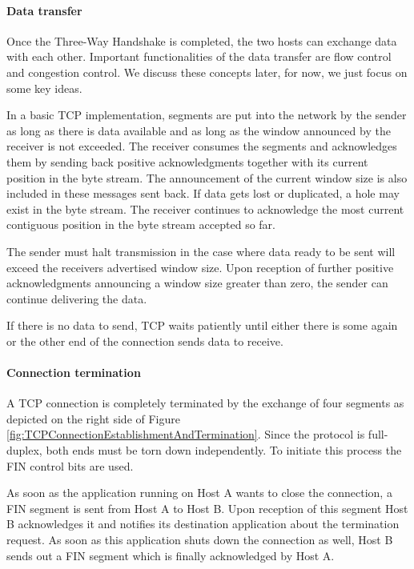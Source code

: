 \paragraph{Data transfer}

Once the Three-Way Handshake is completed, the two hosts can exchange data with each other. Important functionalities of the data transfer are flow control and congestion control. We discuss these concepts later, for now, we just focus on some key ideas. 

In a basic TCP implementation, segments are put into the network by the sender as long as there is data available and as long as the window announced by the receiver is not exceeded. The receiver consumes the segments and acknowledges them by sending back positive acknowledgments together with its current position in the byte stream. The announcement of the current window size is also included in these messages sent back. If data gets lost or duplicated, a hole may exist in the byte stream. The receiver continues to acknowledge the most current contiguous position in the byte stream accepted so far.

The sender must halt transmission in the case where data ready to be sent will exceed the receivers advertised window size. Upon reception of further positive acknowledgments announcing a window size greater than zero, the sender can continue delivering the data.

If there is no data to send, TCP waits patiently until either there is some again or the other end of the connection sends data to receive.  

\paragraph{Connection termination}

A TCP connection is completely terminated by the exchange of four segments as depicted on the right side of Figure \ref{fig:TCPConnectionEstablishmentAndTermination}. Since the protocol is full-duplex, both ends must be torn down independently. To initiate this process the FIN control bits are used. 

As soon as the application running on Host A wants to close the connection, a FIN segment is sent from Host A to Host B. Upon reception of this segment Host B acknowledges it and notifies its destination application about the termination request. As soon as this application shuts down the connection as well, Host B sends out a FIN segment which is finally acknowledged by Host A.

